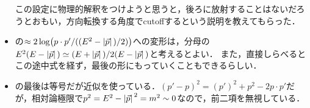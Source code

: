 \begin{itemize}
	この設定に物理的解釈をつけようと思うと，後ろに放射することはないだろうとおもい，方向転換する角度でcutoffするという説明を教えてもらった．


	\item {}の$\approx 2\log(p\cdot p'/((E^2-\abs*{\vec{p}})/2))$への変形は，分母の$E^2(E-\abs*{\vec{p}}) \simeq (E+\abs*{\vec{p}})/2(E-\abs*{\vec{p}})$と考えるとよい．
	また，直接しらべるとこの途中式を経ず，最後の形にもっていくこともできるらしい． 
	\item {}の最後は等号だが近似を使っている．$(p'-p)^2 = (p')^2 + p^2 - 2p\cdot p'$だが，相対論極限で$p^2 = E^2 - \abs*{\vec{p}}^2 = m^2\sim0$なので，前二項を無視している．
\end{itemize}
